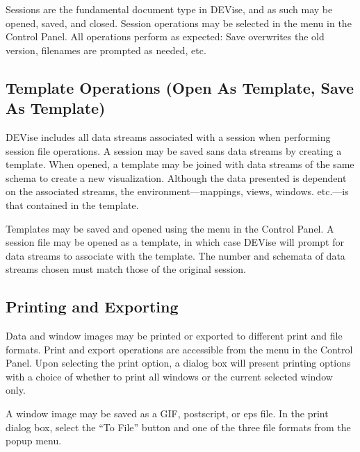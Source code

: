 Sessions are the fundamental document type in DEVise, and as such may be opened,
saved, and closed. Session operations may be selected in the  menu
in the Control Panel. All operations perform as expected: Save overwrites the
old version, filenames are prompted as needed, etc.


\subsection{Template Operations (Open As Template, Save As Template)}

DEVise includes all data streams associated with a session when performing
session file operations. A session may be saved sans data streams by creating a
template. When opened, a template may be joined with data streams of the same
schema to create a new visualization. Although the data presented is dependent
on the associated streams, the environment---mappings, views, windows. etc.---is
that contained in the template.

Templates may be saved and opened using the  menu in the Control
Panel. A session file may be opened as a template, in which case DEVise will
prompt for data streams to associate with the template. The number and schemata
of data streams chosen must match those of the original session.


\subsection{Printing and Exporting}

Data and window images may be printed or exported to different print and file
formats. Print and export operations are accessible from the  menu
in the Control Panel. Upon selecting the print option, a dialog box will present
printing options with a choice of whether to print all windows or the current
selected window only.

A window image may be saved as a GIF, postscript, or eps file. In the print
dialog box, select the ``To File'' button and one of the three file formats from
the popup menu. 


